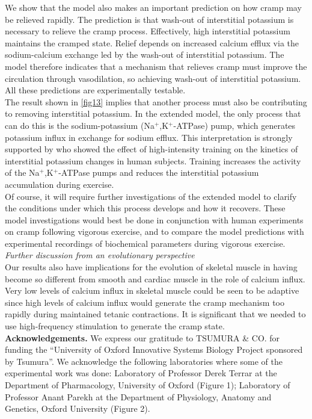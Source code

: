 \documentclass[fleqn,10pt]{physiome}
\begin{document}
We show that the model also makes an important prediction on how cramp may be relieved rapidly. The prediction is that wash-out of interstitial potassium is necessary to relieve the cramp process. Effectively, high interstitial potassium maintains the cramped state. Relief depends on increased calcium efflux via the sodium-calcium exchange led by the wash-out of interstitial potassium. The model therefore indicates that a mechanism that relieves cramp must improve the circulation through vasodilation, so achieving wash-out of interstitial potassium. All these predictions are experimentally testable.\\\newline
The result shown in \autoref{fig13} implies that another process must also be contributing to removing interstitial potassium. In the extended model, the only process that can do this is the sodium-potassium (Na$^+$,K$^+$-ATPase) pump, which generates potassium influx in exchange for sodium efflux. This interpretation is strongly supported by \citep{nielsen2004effects} who showed the effect of high-intensity training on the kinetics of interstitial potassium changes in human subjects. Training increases the activity of the Na$^+$,K$^+$-ATPase pumps and reduces the interstitial potassium accumulation during exercise. \\\newline
Of course, it will require further investigations of the extended model to clarify the conditions under which this process develops and how it recovers. These model investigations would best be done in conjunction with human experiments on cramp following vigorous exercise, and to compare the model predictions with experimental recordings of biochemical parameters during vigorous exercise. \\\newline
\textit{Further discussion from an evolutionary perspective}\\\newline
Our results also have implications for the evolution of skeletal muscle in having become so different from smooth and cardiac muscle in the role of calcium influx. Very low levels of calcium influx in skeletal muscle could be seen to be adaptive since high levels of calcium influx would generate the cramp mechanism too rapidly during maintained tetanic contractions. It is significant that we needed to use high-frequency stimulation to generate the cramp state.\\\newline
\textbf{Acknowledgements.} We express our gratitude to TSUMURA \& CO. for funding the “University of Oxford Innovative Systems Biology Project sponsored by Tsumura”. We acknowledge the following laboratories where some of the experimental work was done: Laboratory of Professor Derek Terrar at the Department of Pharmacology, University of Oxford (Figure 1); Laboratory of Professor Anant Parekh at the Department of Physiology, Anatomy and Genetics, Oxford University (Figure 2).\newpage


\end{document}
